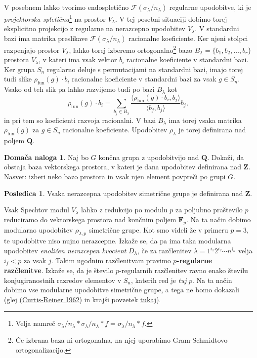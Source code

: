 \documentclass[11pt]{book}
\def\ZZ{\mathbf{Z}}
\def\QQ{\mathbf{Q}}
\def\FF{\mathbf{F}}
\def\Fcal{\mathcal{F}}
\def\youngsym{\sigma_{\lambda}}
\DeclareMathOperator\fun{fun}
\def\definicija{\color{rdeca}\bf}
\theoremstyle{definition}
\theoremstyle{zgled}
\theoremstyle{zgledbrezstevilke}
\theoremstyle{odprtproblem}
\theoremstyle{domacanaloga}
\newtheorem{domacanaloga}[theorem]{Domača naloga}
\theoremstyle{izrek}
\newtheorem{posledica}[theorem]{Posledica}
\begin{document}
V posebnem lahko tvorimo endospletično $\Fcal(\youngsym / n_{\lambda})$ regularne upodobitve, ki je \emph{projektorska spletična}\footnote{Velja namreč $\youngsym/n_{\lambda} * \youngsym/n_{\lambda} * f = \youngsym/n_{\lambda} * f$.} na prostor $V_{\lambda}$. V tej posebni situaciji dobimo torej eksplicitno projekcijo z regularne na nerazcepno upodobitev $V_{\lambda}$. V standardni bazi ima matrika preslikave $\Fcal(\youngsym/n_{\lambda})$ racionalne koeficiente. Ker njeni stolpci razpenjajo prostor $V_{\lambda}$, lahko torej izberemo ortogonalno\footnote{Če izbrana baza ni ortogonalna, na njej uporabimo Gram-Schmidtovo ortogonalizacijo.} bazo $B_{\lambda} = \{ b_1, b_2, \dots, b_r \}$ prostora $V_{\lambda}$, v kateri ima vsak vektor $b_i$ racionalne koeficiente v standardni bazi. Ker grupa $S_n$ regularno deluje s permutacijami na standardni bazi, imajo torej tudi slike $\rho_{\fun}(g) \cdot b_i$ racionalne koeficiente v standardni bazi za vsak $g \in S_n$. Vsako od teh slik pa lahko razvijemo tudi po bazi $B_{\lambda}$ kot
\[
    \rho_{\fun}(g) \cdot b_i
    = \sum_{b_j \in B_{\lambda}} \frac{\langle \rho_{\fun}(g) \cdot b_i, b_j \rangle}{\langle b_j, b_j \rangle} b_j,
\]
in pri tem so koeficienti razvoja racionalni. V bazi $B_{\lambda}$ ima torej vsaka matrika $\rho_{\fun}(g)$ za $g \in S_n$ racionalne koeficiente. Upodobitev $\rho_{\lambda}$ je torej definirana nad poljem $\QQ$.

\begin{domacanaloga}
Naj bo $G$ končna grupa z upodobitvijo nad $\QQ$. Dokaži, da obstaja baza vektorskega prostora, v kateri je dana upodobitev definirana nad $\ZZ$. Nasvet: izberi neko bazo prostora in vsak njen element povpreči po grupi $G$.
\end{domacanaloga}

\begin{posledica}
Vsaka nerazcepna upodobitev simetrične grupe je definirana nad $\ZZ$.
\end{posledica}    

Vsak Spechtov modul $V_{\lambda}$ lahko z redukcijo po modulu $p$ za poljubno praštevilo $p$ reduciramo do vektorskega prostora nad končnim poljem $\FF_p$. Na ta način dobimo modularno upodobitev $\rho_{\lambda,p}$ simetrične grupe. Kot smo videli že v primeru $p = 3$, te upodobitve niso nujno nerazcepne. Izkaže se, da pa ima taka modularna upodobitev \emph{enoličen nerazcepen kvocient} $D_{\lambda}$, če za razčlenitev $\lambda = 1^{i_1} 2^{i_2} \cdots n^{i_n}$ velja $i_j < p$ za vsak $j$. Takim ugodnim razčlenitvam pravimo {\definicija $p$-regularne razčlenitve}. Izkaže se, da je število $p$-regularnih razčlenitev ravno enako številu konjugiranostnih razredov elementov v $S_n$, katerih red je \emph{tuj} $p$. Na ta način dobimo vse modularne upodobitve simetrične grupe, a tega ne bomo dokazali (glej \href{https://www.ams.org/books/chel/356/}{(Curtis-Reiner 1962)} in krajši povzetek \href{https://math.berkeley.edu/~ltomczak/notes/Mich2022/RepSn_Notes.pdf}{tukaj}).
\end{document}
